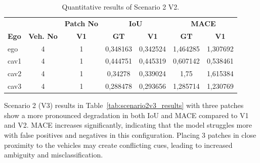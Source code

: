 \begin{table}[H]
    \centering
    \caption{Quantitative results of Scenario 2 V2.}
    \label{tab:scenario2v2_results}
    \begin{adjustbox}{max width=\textwidth}
        \begin{tabularx}{\textwidth}{l c c c c c c}
            \toprule
                &             &   \multicolumn{1}{c}{\textbf{Patch No}}  & \multicolumn{2}{c}{\textbf{IoU}} & \multicolumn{2}{c}{\textbf{MACE}}                            \\
            \cmidrule(lr){4-5}\cmidrule(lr){6-7}
            \textbf{Ego}           &
            \textbf{Veh. No}       &
            \textbf{V1}      &
            \textbf{GT}            & \textbf{V1}  &
            \textbf{GT}            & \textbf{V1}  \\
            \midrule
            ego         & 4  & 1 & 0,348163 & 0,342524 & 1,464285 & 1,307692 \\
            cav1        & 4  & 1 & 0,444751 & 0,445319 & 0,607142 & 0,538461 \\
            cav2        & 4  & 1 & 0,34278 & 0,339024 & 1,75 & 1,615384 \\
            cav3        & 4  & 1 & 0,288478 & 0,293656 & 1,285714 & 1,230769 \\
            \bottomrule
        \end{tabularx}
    \end{adjustbox}
\end{table}

Scenario 2 (V3) results in Table~\ref{tab:scenario2v3_results} with three patches show a more pronounced degradation in both IoU and MACE compared to V1 and V2.
MACE increases significantly, indicating that the model struggles more with false positives and negatives in this configuration.
Placing 3 patches in close proximity to the vehicles may create conflicting cues, leading to increased ambiguity and misclassification.

